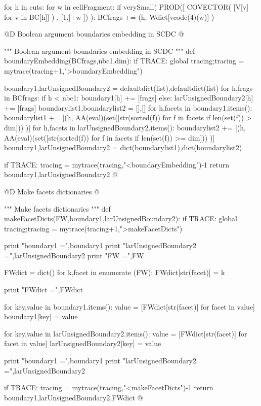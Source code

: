\documentclass[11pt,oneside]{article}	%
\begin{document}
for h in cuts:
	for w in cellFragment:
		if verySmall( PROD([ COVECTOR( [V[v] for v in BC[h]] ) , [1.]+w ]) ):
			BCfrags += (h, Wdict[vcode(4)(w)] )

@D Boolean argument boundaries embedding in SCDC
@{""" Boolean argument boundaries embedding in SCDC """
def boundaryEmbedding(BCfrags,nbc1,dim):
	if TRACE: global tracing;tracing = mytrace(tracing+1,">boundaryEmbedding")

	boundary1,larUnsignedBoundary2 = defaultdict(list),defaultdict(list)						 
	for h,frags in BCfrags:
		if h < nbc1: boundary1[h] += [frags]
		else: larUnsignedBoundary2[h] += [frags]	
	boundarylist1,boundarylist2 = [],[]
	for h,facets in boundary1.items():
		boundarylist1 += [(h, AA(eval)(set([str(sorted(f)) 
							for f in facets if len(set(f)) >= dim])) )]
	for h,facets in larUnsignedBoundary2.items():
		boundarylist2 += [(h, AA(eval)(set([str(sorted(f)) 
							for f in facets if len(set(f)) >= dim])) )]
	boundary1,larUnsignedBoundary2 = dict(boundarylist1),dict(boundarylist2)

	if TRACE: tracing = mytrace(tracing,"<boundaryEmbedding")-1
	return boundary1,larUnsignedBoundary2
@}


@D Make facets dictionaries
@{""" Make facets dictionaries """
def makeFacetDicts(FW,boundary1,larUnsignedBoundary2):
	if TRACE: global tracing;tracing = mytrace(tracing+1,">makeFacetDicts")
	
	print "boundary1 =",boundary1
	print "larUnsignedBoundary2 =",larUnsignedBoundary2
	print "FW =",FW
	
	FWdict = dict()
	for k,facet in enumerate (FW): FWdict[str(facet)] = k
	
	print "FWdict =",FWdict

	for key,value in boundary1.items():
		value = [FWdict[str(facet)] for facet in value]
		boundary1[key] = value
		
	for key,value in larUnsignedBoundary2.items():
		value = [FWdict[str(facet)] for facet in value]
		larUnsignedBoundary2[key] = value

	print "boundary1 =",boundary1
	print "larUnsignedBoundary2 =",larUnsignedBoundary2

	if TRACE: tracing = mytrace(tracing,"<makeFacetDicts")-1
	return boundary1,larUnsignedBoundary2,FWdict
@}
\end{document}
